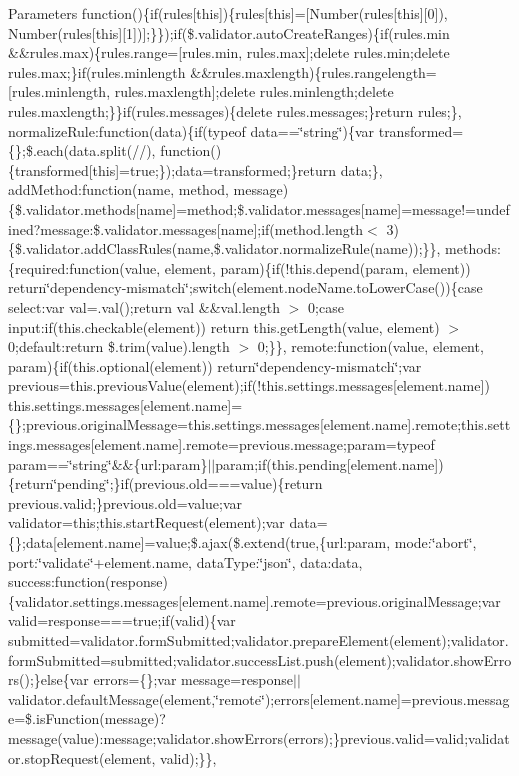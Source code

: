 {\begin{DoxyParams}{Parameters}
function()\{if(rules\mbox{[}this\mbox{]})\{rules\mbox{[}this\mbox{]}=\mbox{[}Number(rules\mbox{[}this\mbox{]}\mbox{[}0\mbox{]}), Number(rules\mbox{[}this\mbox{]}\mbox{[}1\mbox{]})\mbox{]};\}\});if(\$.validator.\+auto\+Create\+Ranges)\{if(rules.\+min \&\&rules.\+max)\{rules.\+range=\mbox{[}rules.\+min, rules.\+max\mbox{]};delete rules.\+min;delete rules.\+max;\}if(rules.\+minlength \&\&rules.\+maxlength)\{rules.\+rangelength=\mbox{[}rules.\+minlength, rules.\+maxlength\mbox{]};delete rules.\+minlength;delete rules.\+maxlength;\}\}if(rules.\+messages)\{delete rules.\+messages;\}return rules;\}, normalize\+Rule\+:function(data)\{if(typeof data==\char`\"{}string\char`\"{})\{var transformed=\{\};\$.each(data.\+split(//), function()\{transformed\mbox{[}this\mbox{]}=true;\});data=transformed;\}return data;\}, add\+Method\+:function(name, method, message)\{\$.validator.\+methods\mbox{[}name\mbox{]}=method;\$.validator.\+messages\mbox{[}name\mbox{]}=message!=undefined?message\+:\$.validator.\+messages\mbox{[}name\mbox{]};if(method.\+length$<$ 3)\{\$.validator.\+add\+Class\+Rules(name,\$.validator.\+normalize\+Rule(name));\}\}, methods\+:\{required\+:function(value, element, param)\{if(!this.depend(param, element)) return\char`\"{}dependency-\/mismatch\char`\"{};switch(element.\+node\+Name.\+to\+Lower\+Case())\{case \textquotesingle{}select\textquotesingle{}\+:var val=.val();return val \&\&val.\+length $>$ 0;case \textquotesingle{}input\textquotesingle{}\+:if(this.\+checkable(element)) return this.\+get\+Length(value, element) $>$ 0;default\+:return \$.trim(value).length $>$ 0;\}\}, remote\+:function(value, element, param)\{if(this.\+optional(element)) return\char`\"{}dependency-\/mismatch\char`\"{};var previous=this.\+previous\+Value(element);if(!this.settings.\+messages\mbox{[}element.\+name\mbox{]}) this.\+settings.\+messages\mbox{[}element.\+name\mbox{]}=\{\};previous.\+original\+Message=this.\+settings.\+messages\mbox{[}element.\+name\mbox{]}.remote;this.\+settings.\+messages\mbox{[}element.\+name\mbox{]}.remote=previous.\+message;param=typeof param==\char`\"{}string\char`\"{}\&\&\{url\+:param\}$\vert$$\vert$param;if(this.\+pending\mbox{[}element.\+name\mbox{]})\{return\char`\"{}pending\char`\"{};\}if(previous.\+old===value)\{return previous.\+valid;\}previous.\+old=value;var validator=this;this.\+start\+Request(element);var data=\{\};data\mbox{[}element.\+name\mbox{]}=value;\$.ajax(\$.extend(true,\{url\+:param, mode\+:\char`\"{}abort\char`\"{}, port\+:\char`\"{}validate\char`\"{}+element.name, data\+Type\+:\char`\"{}json\char`\"{}, data\+:data, success\+:function(response)\{validator.\+settings.\+messages\mbox{[}element.\+name\mbox{]}.remote=previous.\+original\+Message;var valid=response===true;if(valid)\{var submitted=validator.\+form\+Submitted;validator.\+prepare\+Element(element);validator.\+form\+Submitted=submitted;validator.\+success\+List.\+push(element);validator.\+show\+Errors();\}else\{var errors=\{\};var message=response$\vert$$\vert$validator.default\+Message(element,\char`\"{}remote\char`\"{});errors\mbox{[}element.\+name\mbox{]}=previous.\+message=\$.is\+Function(message)?message(value)\+:message;validator.\+show\+Errors(errors);\}previous.\+valid=valid;validator.\+stop\+Request(element, valid);\}\}, 
\end{DoxyParams}}
